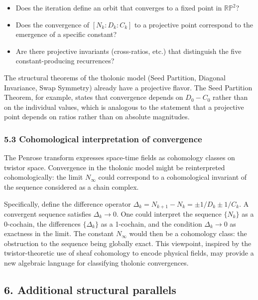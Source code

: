 \documentclass[
  11pt,
  letterpaper,
]{article}
\providecommand{\tightlist}{%
  \setlength{\itemsep}{0pt}\setlength{\parskip}{0pt}}
\begin{document}
\begin{itemize}
\tightlist
\item
  Does the iteration define an orbit that converges to a fixed point in
  \(\mathbb{RP}^2\)?
\item
  Does the convergence of \([N_k : D_k : C_k]\) to a projective point
  correspond to the emergence of a specific constant?
\item
  Are there projective invariants (cross-ratios, etc.) that distinguish
  the five constant-producing recurrences?
\end{itemize}

The structural theorems of the tholonic model (Seed Partition, Diagonal
Invariance, Swap Symmetry) already have a projective flavor. The Seed
Partition Theorem, for example, states that convergence depends on
\(D_0 - C_0\) rather than on the individual values, which is analogous
to the statement that a projective point depends on ratios rather than
on absolute magnitudes.

\subsubsection{5.3 Cohomological interpretation of
convergence}\label{cohomological-interpretation-of-convergence}

The Penrose transform expresses space-time fields as cohomology classes
on twistor space. Convergence in the tholonic model might be
reinterpreted cohomologically: the limit \(N_\infty\) could correspond
to a cohomological invariant of the sequence considered as a chain
complex.

Specifically, define the difference operator
\(\Delta_k = N_{k+1} - N_k = \pm 1/D_k \pm 1/C_k\). A convergent
sequence satisfies \(\Delta_k \to 0\). One could interpret the sequence
\(\{N_k\}\) as a 0-cochain, the differences \(\{\Delta_k\}\) as a
1-cochain, and the condition \(\Delta_k \to 0\) as exactness in the
limit. The constant \(N_\infty\) would then be a cohomology class: the
obstruction to the sequence being globally exact. This viewpoint,
inspired by the twistor-theoretic use of sheaf cohomology to encode
physical fields, may provide a new algebraic language for classifying
tholonic convergences.

\subsection{6. Additional structural
parallels}\label{additional-structural-parallels}
\end{document}
